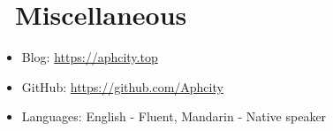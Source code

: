 \documentclass[12pt]{resume}
\begin{document}
\section{\texorpdfstring{\textbf{}\ Miscellaneous}{Miscellaneous}}
\begin{itemize}[parsep=0.5ex]
  \item Blog: \url{https://aphcity.top}
  \item GitHub: \url{https://github.com/Aphcity}
  \item Languages: English - Fluent, Mandarin - Native speaker
\end{itemize}

%
%
\end{document}
